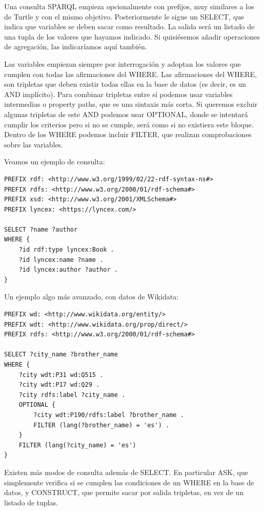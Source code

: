 \documentclass[12pt]{report} %
\begin{document}
Una consulta SPARQL empieza opcionalmente con prefijos, muy similares a los de Turtle y con el mismo objetivo. Posteriormente le sigue un SELECT, que indica que variables se deben sacar como resultado. La salida será un listado de una tupla de los valores que hayamos indicado. Si quisiésemos añadir operaciones de agregación, las indicaríamos aquí también.

Las variables empiezan siempre por interrogación y adoptan los valores que cumplen con todas las afirmaciones del WHERE. Las afirmaciones del WHERE, son tripletas que deben existir todas ellas en la base de datos (es decir, es un AND implícito). Para combinar tripletas entre sí podemos usar variables intermedias o property paths, que es una sintaxis más corta. Si queremos excluir algunas tripletas de este AND podemos usar OPTIONAL, donde se intentará cumplir los criterios pero si no se cumple, será como si no existiera este bloque. Dentro de los WHERE podemos incluir FILTER, que realizan comprobaciones sobre las variables.

Veamos un ejemplo de consulta:

\begin{lstlisting}
PREFIX rdf: <http://www.w3.org/1999/02/22-rdf-syntax-ns#>
PREFIX rdfs: <http://www.w3.org/2000/01/rdf-schema#>
PREFIX xsd: <http://www.w3.org/2001/XMLSchema#>
PREFIX lyncex: <https://lyncex.com/>

SELECT ?name ?author
WHERE {
    ?id rdf:type lyncex:Book .
    ?id lyncex:name ?name .
    ?id lyncex:author ?author .
}
\end{lstlisting}

Un ejemplo algo más avanzado, con datos de Wikidata:

\begin{lstlisting}
PREFIX wd: <http://www.wikidata.org/entity/>
PREFIX wdt: <http://www.wikidata.org/prop/direct/>
PREFIX rdfs: <http://www.w3.org/2000/01/rdf-schema#>

SELECT ?city_name ?brother_name
WHERE {
    ?city wdt:P31 wd:Q515 .
    ?city wdt:P17 wd:Q29 .
    ?city rdfs:label ?city_name .
    OPTIONAL {
        ?city wdt:P190/rdfs:label ?brother_name .
        FILTER (lang(?brother_name) = 'es') .
    }
    FILTER (lang(?city_name) = 'es')
}
\end{lstlisting}

Existen más modos de consulta además de SELECT. En particular ASK, que simplemente verifica si se cumplen las condiciones de un WHERE en la base de datos, y CONSTRUCT, que permite sacar por salida tripletas, en vez de un listado de tuplas.
\end{document}
